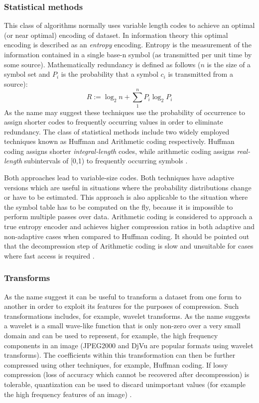 \documentclass{acm_proc_article-sp}
\begin{document}
\subsubsection{Statistical methods}
This class of algorithms normally uses variable length codes to achieve an optimal (or near optimal) encoding of dataset. In information theory this optimal encoding is 
described as an \textit{entropy} encoding. Entropy is the measurement of the information contained in a single base-n symbol (as transmitted per unit time by some source). Mathematically
redundancy is defined as follows ($n$ is the size of a symbol set and $P_{i}$ is the probability that a symbol $c_{i}$ is transmitted from a source)\cite[p. 46 - 47]{salomon2004data}:
\begin{equation}
 R := \log_2n + \sum_1^nP_i\log_2P_i
\end{equation}
As the name may suggest these techniques use the probability of occurrence to assign shorter codes to frequently occurring values in order to eliminate redundancy. The 
class of statistical methods include two widely employed techniques known as Huffman and Arithmetic coding respectively. Huffman coding assigns shorter \textit{integral-length} codes, while arithmetic 
coding assigns \textit{real-length} subintervals of [0,1) to frequently occurring symbols \cite{Witten:1987:ACD:214762.214771}\cite[ch. 2]{salomon2004data}.

Both approaches lead to variable-size codes. Both techniques have adaptive versions which are useful in situations where the probability distributions change or have to be estimated. This 
approach is also applicable to the situation where the symbol table has to be computed on the fly, because it is impossible to perform multiple passes over data. Arithmetic 
coding is considered to approach a true entropy encoder and achieves higher compression ratios in both adaptive and non-adaptive cases when compared to Huffman coding. It should be 
pointed out that the decompression step of Arithmetic coding is slow and unsuitable for cases where fast access is required \cite{ray1995database,williams1999compressing}\cite[ch. 2]{salomon2004data}.

\subsubsection{Transforms}
As the name suggest it can be useful to transform a dataset from one form to another in order to exploit its features for the purposes of compression. Such transformations 
includes, for example, wavelet transforms. As the name suggests a wavelet is a small wave-like function that is only non-zero over a very small domain and can be used 
to represent, for example, the high frequency components in an image (JPEG2000 and DjVu are popular formats using wavelet transforms). The coefficients within this 
transformation can then be further compressed using other techniques, for example, Huffman coding. If lossy compression (loss of accuracy which cannot be recovered after 
decompression)  is tolerable, quantization can be used to discard unimportant values (for example the high frequency features of an image) \cite{952804}\cite[ch. 5]{salomon2004data}.
\end{document}
